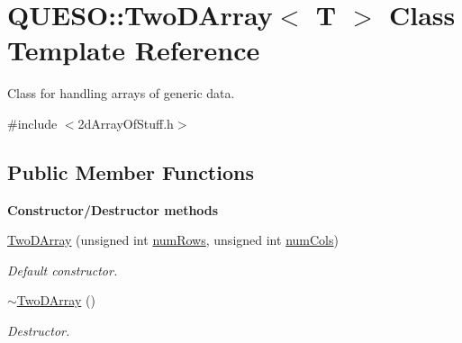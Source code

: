 \hypertarget{class_q_u_e_s_o_1_1_two_d_array}{\section{Q\-U\-E\-S\-O\-:\-:Two\-D\-Array$<$ T $>$ Class Template Reference}
\label{class_q_u_e_s_o_1_1_two_d_array}
}


Class for handling arrays of generic data.  




{\ttfamily \#include $<$2d\-Array\-Of\-Stuff.\-h$>$}

\subsection*{Public Member Functions}
\begin{Indent}{\bf Constructor/\-Destructor methods}\par
\begin{DoxyCompactItemize}
\item 
\hyperlink{class_q_u_e_s_o_1_1_two_d_array_a61198628e4a47604bf5ad7142b151372}{Two\-D\-Array} (unsigned int \hyperlink{class_q_u_e_s_o_1_1_two_d_array_a0c81a74def0364a5ddd3e1371ca48b39}{num\-Rows}, unsigned int \hyperlink{class_q_u_e_s_o_1_1_two_d_array_aac40245b6f6a944d62a34d44324af5b2}{num\-Cols})
\begin{DoxyCompactList}\small\item\em Default constructor. \end{DoxyCompactList}\item 
\hyperlink{class_q_u_e_s_o_1_1_two_d_array_a057af83ed31f9ca5c3b4cc52b5383f70}{$\sim$\-Two\-D\-Array} ()
\begin{DoxyCompactList}\small\item\em Destructor. \end{DoxyCompactList}\end{DoxyCompactItemize}
\end{Indent}
